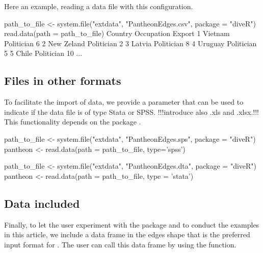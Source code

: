 

Here an example, reading a data file with this configuration.

\begin{example}
 path_to_file <- system.file("extdata", "PantheonEdges.csv", package = "diveR")
 read.data(path = path_to_file)
         Country          Occupation Export
1        Vietnam          Politician      6
2     New Zeland          Politician      2
3         Latvia          Politician      8
4        Uruguay          Politician      5
5          Chile          Politician     10
...
\end{example}


\subsection{Files in other formats}
To facilitate the import of data, we provide a parameter  that can be used to indicate if the data file is of type Stata or SPSS. !!!introduce also .xls and .xlsx.!!! This functionality depends on the package .

\begin{example}
     path_to_file <- system.file("extdata", "PantheonEdges.sps", package = "diveR")
     pantheon <-  read.data(path = path_to_file, type='spss')
     
     path_to_file <- system.file("extdata", "PantheonEdges.dta", package = "diveR")
     pantheon <- read.data(path = path_to_file, type = 'stata')
\end{example}
 
\subsection{Data included}

Finally, to let the user experiment with the package and to conduct the examples in this article, we include a data frame in the edges shape that is the preferred input format for . The user can call this data frame by using the  function. 



